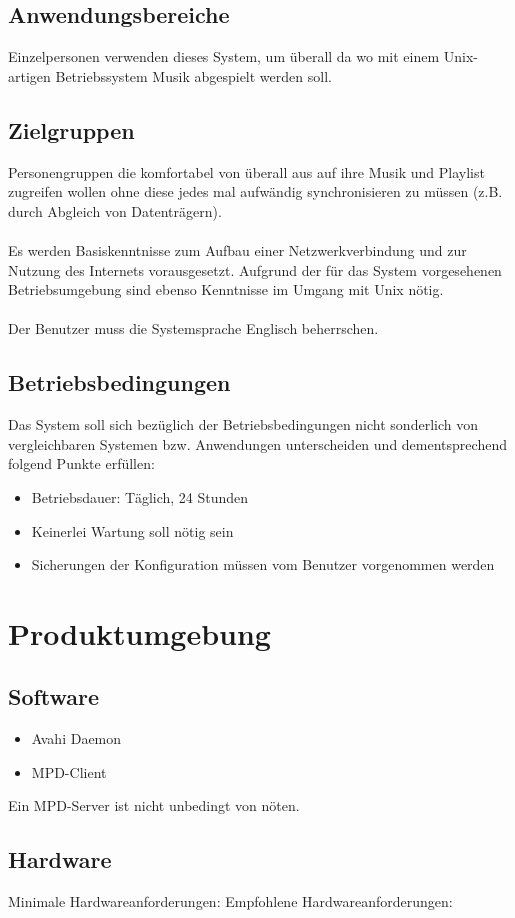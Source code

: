 \subsection{Anwendungsbereiche}
Einzelpersonen verwenden dieses System, um überall da wo mit 
einem Unix-artigen Betriebssystem Musik abgespielt werden soll.
\subsection{Zielgruppen}
Personengruppen die komfortabel von überall aus auf ihre Musik und Playlist zugreifen
wollen ohne diese jedes mal aufwändig synchronisieren zu müssen (z.B. durch Abgleich von Datenträgern).\ \\ \\
Es werden Basiskenntnisse zum Aufbau einer Netzwerkverbindung und zur Nutzung des Internets vorausgesetzt.
Aufgrund der für das System vorgesehenen Betriebsumgebung sind ebenso Kenntnisse im Umgang mit Unix nötig.\ \\ \\
Der Benutzer muss die Systemsprache Englisch beherrschen.
\subsection{Betriebsbedingungen}
Das System soll sich bezüglich der Betriebsbedingungen nicht sonderlich von vergleichbaren Systemen bzw.
Anwendungen unterscheiden und dementsprechend folgend Punkte erfüllen:
\begin{itemize}
	\item Betriebsdauer: Täglich, 24 Stunden
	\item Keinerlei Wartung soll nötig sein
	\item Sicherungen der Konfiguration müssen vom Benutzer vorgenommen werden
\end{itemize}
\section{Produktumgebung}
\subsection{Software}
\begin{itemize}
	\item Avahi Daemon
	\item MPD-Client
\end{itemize}
Ein MPD-Server ist nicht unbedingt von nöten.
\subsection{Hardware}
Minimale Hardwareanforderungen:
Empfohlene Hardwareanforderungen:
